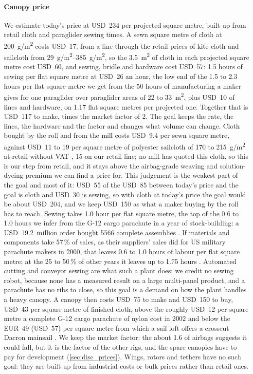\paragraph{Canopy price} We estimate today's price at USD~234 per projected square metre, built up from retail cloth and paraglider sewing times. A sewn square metre of cloth at \SI{200}{g/m^2} costs USD~17, from a line through the retail prices of kite cloth and sailcloth from \SIrange{29}{385}{g/m^2}, so the \SI{3.5}{m^2} of cloth in each projected square metre cost USD~60, and sewing, bridle and hardware cost USD~57: 1.5 hours of sewing per flat square metre at USD~26 an hour, the low end of the 1.5 to 2.3 hours per flat square metre we get from the 50 hours of manufacturing a maker gives for one paraglider \citep{skycz2017} over paraglider areas of 22 to \SI{33}{m^2}, plus USD~10 of lines and hardware, on 1.17 flat square metres per projected one. Together that is USD~117 to make, times the market factor of 2. The goal keeps the rate, the lines, the hardware and the factor and changes what volume can change. Cloth bought by the roll and from the mill costs USD~9.4 per sewn square metre, against USD~11 to 19 per square metre of polyester sailcloth of 170 to \SI{215}{g/m^2} at retail without VAT \citep{extremtextil_prices_2026,sailrite_dacron_prices_2026}, 15 on our retail line; no mill has quoted this cloth, so this is our step from retail, and it stays above the airbag-grade weaving and solution-dyeing premium we can find a price for. This judgement is the weakest part of the goal and most of it: USD~55 of the USD~85 between today's price and the goal is cloth and USD~30 is sewing, so with cloth at today's price the goal would be about USD~204, and we keep USD~150 as what a maker buying by the roll has to reach. Sewing takes 1.0 hour per flat square metre, the top of the 0.6 to 1.0 hours we infer from the G-12 cargo parachute in a year of stock-building: a USD~19.2~million order bought \num{5566} complete assemblies \citep{bis2004,mills_g12_web}. If materials and components take 57\,\% of sales, as their suppliers' sales did for US military parachute makers in 2000, that leaves 0.6 to 1.0 hours of labour per flat square metre; at the 25 to 50\,\% of other years it leaves up to 1.75 hours \citep{bis2004}. Automated cutting and conveyor sewing are what such a plant does; we credit no sewing robot, because none has a measured result on a large multi-panel product, and a parachute has no ribs to close, so this goal is a demand on how the plant handles a heavy canopy. A canopy then costs USD~75 to make and USD~150 to buy, USD~43 per square metre of finished cloth, above the roughly USD~12 per square metre a complete G-12 cargo parachute of nylon cost in 2002 \citep{bis2004,mills_g12_web} and below the EUR~49 (USD~57) per square metre from which a sail loft offers a crosscut Dacron mainsail \citep{horizonsails_web}. We keep the market factor: the about 1.6 of airbags suggests it could fall, but it is the factor of the other rigs, and the spare canopies have to pay for development (\cref{sec:disc_prices}). Wings, rotors and tethers have no such goal: they are built up from industrial costs or bulk prices rather than retail ones.

